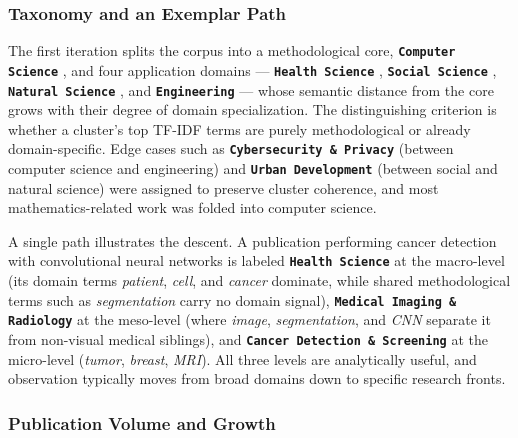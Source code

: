 \documentclass{article}
\begin{document}
	\subsubsection{Taxonomy and an Exemplar Path}
	\label{exemplar_clustering_path_section}
	
	The first iteration splits the corpus into a methodological core, \textbf{\texttt{Computer Science}} , and four application domains --- \textbf{\texttt{Health Science}} , \textbf{\texttt{Social Science}} , \textbf{\texttt{Natural Science}} , and \textbf{\texttt{Engineering}}  --- whose semantic distance from the core grows with their degree of domain specialization. The distinguishing criterion is whether a cluster's top TF-IDF terms are purely methodological or already domain-specific. Edge cases such as \textbf{\texttt{Cybersecurity \& Privacy}}  (between computer science and engineering) and \textbf{\texttt{Urban Development}}  (between social and natural science) were assigned to preserve cluster coherence, and most mathematics-related work was folded into computer science.
	
	A single path illustrates the descent. A publication performing cancer detection with convolutional neural networks is labeled \textbf{\texttt{Health Science}}  at the macro-level (its domain terms \textit{patient}, \textit{cell}, and \textit{cancer} dominate, while shared methodological terms such as \textit{segmentation} carry no domain signal), \textbf{\texttt{Medical Imaging \& Radiology}}  at the meso-level (where \textit{image}, \textit{segmentation}, and \textit{CNN} separate it from non-visual medical siblings), and \textbf{\texttt{Cancer Detection \& Screening}}  at the micro-level (\textit{tumor}, \textit{breast}, \textit{MRI}). All three levels are analytically useful, and observation typically moves from broad domains down to specific research fronts.
	
	\subsubsection{Publication Volume and Growth}
	\label{cluster_size_meso_level}
	
\end{document}
